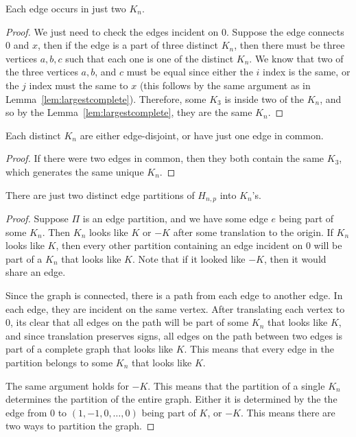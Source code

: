\documentclass[runningheads,a4paper]{llncs}
\begin{document}
\begin{lemma}
Each edge occurs in just two $K_n$.
\end{lemma}

\begin{proof}
We just need to check the edges incident on 0. Suppose the edge connects $0$ and $x$, then if the edge is a part of three distinct $K_n$, then there must be three vertices $a, b, c$ such that each one is one of the distinct $K_n$. We know that two of the three vertices $a, b$, and $c$ must be equal since either the $i$ index is the same, or the $j$ index must the same to $x$ (this follows by the same argument as in Lemma~\ref{lem:largestcomplete}). Therefore, some $K_3$ is inside two of the $K_n$, and so by the Lemma~\ref{lem:largestcomplete}, they are the same $K_n$.
\end{proof}

\begin{lemma}
Each distinct $K_n$ are either edge-disjoint, or have just one edge in common.
\end{lemma}

\begin{proof}
If there were two edges in common, then they both contain the same $K_3$, which generates the same unique $K_n$. 
\end{proof}

\begin{lemma}
\label{lem:distinctpart}
There are just two distinct edge partitions of $H_{n,p}$ into $K_n$'s.
\end{lemma}

\begin{proof}
Suppose $\Pi$ is an edge partition, and we have some edge $e$ being part of some $K_n$. Then $K_n$ looks like $K$ or $-K$ after some translation to the origin. If $K_n$ looks like $K$, then every other partition containing an edge incident on $0$ will be part of a $K_n$ that looks like $K$. Note that if it looked like $-K$, then it would share an edge. 

Since the graph is connected, there is a path from each edge to another edge. In each edge, they are incident on the same vertex. After translating each vertex to 0, its clear that all edges on the path will be part of some $K_n$ that looks like $K$, and since translation preserves signs, all edges on the path between two edges is part of a complete graph that looks like $K$. This means that every edge in the partition belongs to some $K_n$ that looks like $K$.

The same argument holds for $-K$. This means that the partition of a single $K_n$ determines the partition of the entire graph. Either it is determined by the the edge from $0$ to $(1, -1, 0, \dots, 0)$ being part of $K$, or $-K$. This means there are two ways to partition the graph.  
\end{proof}
\end{document}

